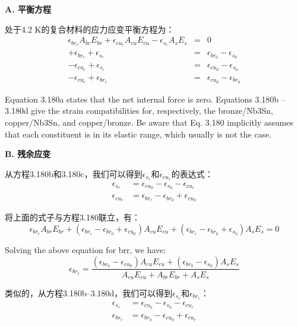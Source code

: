\textbf{A. 平衡方程}

处于4.2 K的复合材料的应力应变平衡方程为：
\begin{eqnarray}%
\epsilon_{br_r}A_{br}E_{br}+\epsilon_{cu_r}A_{cu}E_{cu}-\epsilon_{s_r}A_sE_s&=&0\\
+\epsilon_{br_r}+\epsilon_{s_r}&=&\epsilon_{br_0}-\epsilon_{s_0}\\
-\epsilon_{cu_r}+\epsilon_{s_r}&=&\epsilon_{cu_0}-\epsilon_{s_0}\\
-\epsilon_{cu_r}+\epsilon_{br_r}&=&\epsilon_{cu_0}-\epsilon_{br_0}
\end{eqnarray}

Equation 3.180a states that the net internal force is zero. Equations 3.180b –3.180d
give the strain compatibilities for, respectively, the bronze/Nb3Sn, copper/Nb3Sn,
and copper/bronze. Be aware that Eq. 3.180 implicitly assumes that each constituent is in its elastic range, which usually is not the case.

\textbf{B. 残余应变}

从方程3.180b和3.180c，我们可以得到$\epsilon_{s_r}$和$\epsilon_{cu_r}$的表达式：
\begin{eqnarray*}%
\epsilon_{s_r}&=\epsilon_{cu_0}-\epsilon_{s_0}-\epsilon_{cu_r}\\
\epsilon_{cu_r}&=\epsilon_{br_r}-\epsilon_{br_0}+\epsilon_{cu_0}
\end{eqnarray*}

将上面的式子与方程3.180联立，有：
\begin{equation*}
\epsilon_{br_r}A_{br}E_{br}+(\epsilon_{br_r}-\epsilon_{br_0}+\epsilon_{cu_0})A_{cu}E_{cu}+(\epsilon_{br_r}-\epsilon_{br_0}+\epsilon_{s_0})A_sE_s=0
\end{equation*}

Solving the above equation for brr, we have:
 \begin{equation}%
\epsilon_{br_r}=\frac{(\epsilon_{br_0}-\epsilon_{cu_0})A_{cu}E_{cu}+(\epsilon_{br_0}-\epsilon_{s_0})A_sE_s}{A_{cu}E_{cu}+A_{br}E_{br}+A_{s}E_{s}}
\end{equation}

类似的，从方程3.180b–3.180d，我们可以得到$\epsilon_{s_r}$和$\epsilon_{br_r}$：
\begin{eqnarray*}
\epsilon_{s_r}&=\epsilon_{cu_0}-\epsilon_{s_0}-\epsilon_{cu_r}\\
\epsilon_{br_r}&=\epsilon_{br_0}-\epsilon_{cu_0}+\epsilon_{cu_r}
\end{eqnarray*}

